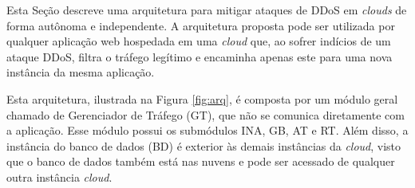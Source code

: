 



Esta Seção descreve uma arquitetura para mitigar ataques de DDoS em \emph{clouds} de forma autônoma e independente. A arquitetura proposta pode ser utilizada por qualquer aplicação web hospedada em uma \emph{cloud} que, ao sofrer indícios de um ataque DDoS, filtra o tráfego legítimo e encaminha apenas este para uma nova instância da mesma aplicação. 

Esta arquitetura, ilustrada na Figura \ref{fig:arq}, é composta por um módulo geral chamado de Gerenciador de Tráfego (GT), que não se comunica diretamente com a aplicação. Esse módulo possui os submódulos INA, GB, AT e RT. Além disso, a instância do banco de dados (BD) é exterior às demais instâncias da \emph{cloud}, visto que o banco de dados também está nas nuvens e pode ser acessado de qualquer outra instância \emph{cloud}. 

